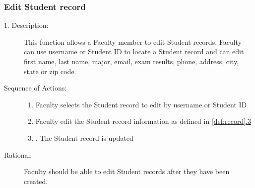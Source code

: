    \subsubsection{\large Edit Student record} 
   \begin{boxed} %
      \begin{description}
         \item[1. Description:\label{desc:edit_record}]
      This function allows a Faculty member to edit Student records. Faculty can
      use username or Student ID to locate a Student record and can edit first
      name, last name, major, email, exam results, phone, address, city, state
      or zip code.
         
            \item[Sequence of Actions:]\hspace{10cm}
         \begin{enumerate}
            \item Faculty selects the Student record to edit by username or
               Student ID
            \item Faculty edit the Student record information as defined in
               \autoref{def:record}\hyperref[def:record]{.3}
            \item. The Student record is updated
      \end{enumerate}

            \item[Rational:]
         Faculty should be able to edit Student records after they have been created.
      \end{description}
   \end{boxed} %

